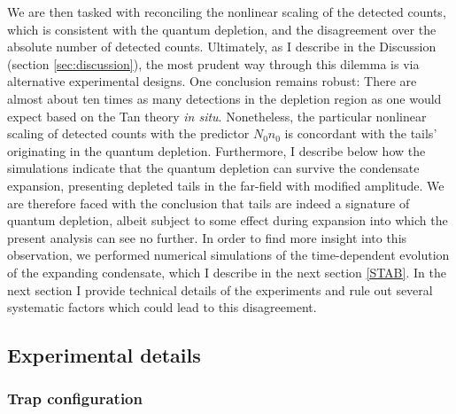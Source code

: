 	We are then tasked with reconciling the nonlinear scaling of the detected counts, which is consistent with the quantum depletion, and the disagreement over the absolute number of detected counts.
	Ultimately, as I describe in the Discussion (section \ref {sec:discussion}), the most prudent way through this dilemma is via alternative experimental designs.
	One conclusion remains robust: There are {almost} about ten times as many detections in the depletion region as one would expect based on the Tan theory {\emph{in situ}}. 
	Nonetheless, the particular nonlinear scaling of detected counts with the predictor $N_0n_0$ is concordant with the tails' originating in the quantum depletion.
	Furthermore, I describe below how the simulations indicate that the quantum depletion can survive the condensate expansion, presenting depleted tails in the far-field with modified amplitude. 
	We are therefore faced with the conclusion that tails are indeed a signature of quantum depletion, albeit subject to some effect during expansion into which the present analysis can see no further. 
	In order to find more insight into this observation, we performed numerical simulations of the time-dependent evolution of the expanding condensate, which I describe in the next section \ref{STAB}.
	In the next section I provide technical details of the experiments and rule out several systematic factors which could lead to this disagreement.
 	
	


\subsection{Experimental details}
\label{sec:exp_details}
\subsubsection{Trap configuration}

